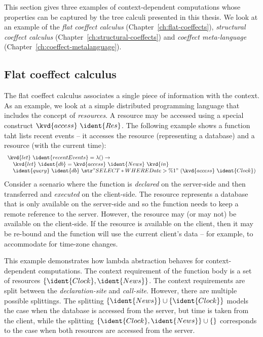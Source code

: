 This section gives three examples of context-dependent computations whose properties can be captured
by the tree calculi presented in this thesis. We look at an example of the \emph{flat coeffect calculus} 
(Chapter~\ref{ch:flat-coeffects}), \emph{structural coeffect calculus} (Chapter~\ref{ch:structural-coeffects})
and \emph{coeffect meta-language} (Chapter~\ref{ch:coeffect-metalanguage}).


\subsection{Flat coeffect calculus}

The flat coeffect calculus associates a single piece of information with the context. As an example,
we look at a simple distributed programming language that includes the concept of \emph{resources}.
A resource may be accessed using a special construct $\kvd{access}~\ident{Res}$. The following 
example shows a function taht lists recent events -- it accesses the resource  
(representing a database) and a resource  (with the current time):
%
\begin{equation*}
\begin{array}{l}
\kvd{let}~\ident{recentEvents} = \lambda () \rightarrow\\
\quad\kvd{let}~\ident{db} = \kvd{access}~\ident{News}~\kvd{in}\\
\quad\ident{query}~\ident{db}~\str{"SELECT * WHERE Date > \%1"}~(\kvd{access}~\ident{Clock})
\end{array}
\end{equation*}
%
Consider a scenario where the function is \emph{declared} on the server-side and then
transferred and \emph{executed} on the client-side. The resource  represents a 
database that is only available on the server-side and so the function needs to keep a remote
reference to the server. However, the  resource may (or may not) be available on the
client-side. If the resource is available on the client, then it may be re-bound and the function
will use the current client's data -- for example, to accommodate for time-zone changes.

This example demonstrates how lambda abstraction behaves for context-dependent computations. The 
context requirement of the function body is a set of resources $\{\ident{Clock}, \ident{News}\}$.
The context requirements are split between the \emph{declaration-site} and \emph{call-site}.
However, there are multiple possible splittings. The splitting $\{\ident{News}\} \cup \{\ident{Clock}\}$
models the case when the database is accessed from the server, but time is taken from the client,
while the splitting $\{\ident{Clock}, \ident{News}\} \cup \{\}$ corresponds to the case when both
resources are accessed from the server.

